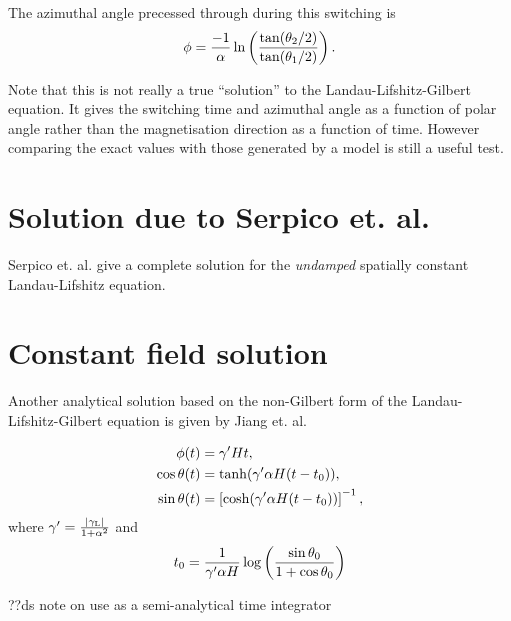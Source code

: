 The azimuthal angle precessed through during this switching is
\begin{equation}
  \phi = \frac{-1}{\alpha} \ln \left( \frac{\tan(\theta_2/2)}{\tan(\theta_1/2)} \right).
\end{equation}

Note that this is not really a true ``solution'' to the Landau-Lifshitz-Gilbert equation.
It gives the switching time and azimuthal angle as a function of polar angle rather than the magnetisation direction as a function of time. However comparing the exact values with those generated by a model is still a useful test.

\section{Solution due to Serpico et. al.}

Serpico et. al. \cite{Serpico2003} give a complete solution for the \emph{undamped} spatially constant Landau-Lifshitz equation.




\section{Constant field solution}

Another analytical solution based on the non-Gilbert form of the Landau-Lifshitz-Gilbert equation is given by Jiang et. al.\cite{Jiang2001}

\begin{align*}
  \phi(t) &= \gamma' H t, \\
  \cos \theta(t) &= \tanh (\gamma' \alpha H (t - t_0)), \\
  \sin \theta(t) &= \left[ \cosh (\gamma' \alpha H (t - t_0)) \right]^{-1}, \\
\end{align*}
where $\gamma' = \frac{{\left|{\gamma_{\text{\tiny{L}}}} \right|}}{1 + \alpha^2}$ and
\begin{equation}
  t_0 = \frac{1}{\gamma' \alpha H} \log \left( \frac{\sin \theta_0}{1 + \cos \theta_0} \right)
\end{equation}


??ds note on use as a semi-analytical time integrator



